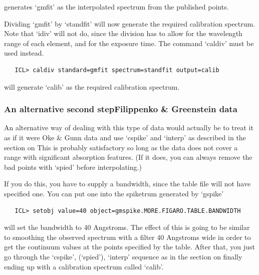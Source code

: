    generates `gmfit' as the interpolated spectrum from the published
   points.

   Dividing `gmfit' by `standfit' will now generate the required
   calibration spectrum.  Note that `idiv' will not do, since the
   division has to allow for the wavelength range of each element, and
   for the exposure time.  The command `caldiv' must be used instead.

\begin{verbatim}
   ICL> caldiv standard=gmfit spectrum=standfit output=calib
\end{verbatim}

   will generate `calib' as the required calibration spectrum.


\subsubsection{\label{techno5fgsecalt}An alternative second
   step\latorhtm{---}{-}Filippenko \& Greenstein data}

   An alternative way of dealing with this type of data would actually
   be to treat it as if it were Oke \& Gunn data and use `cspike' and
   `interp' as described in
   {the section on }
   This is probably satisfactory so long as the data does not cover a
   range with significant absorption features.  (If it does, you can
   always remove the bad points with `spied' before interpolating.)

   If you do this, you have to supply a bandwidth, since the table file
   will not have specified one.  You can put one into the spiketrum
   generated by `gspike'
   {}

\begin{verbatim}
   ICL> setobj value=40 object=gmspike.MORE.FIGARO.TABLE.BANDWIDTH
\end{verbatim}

   will set the bandwidth to 40 Angstroms.  The effect of this is going
   to be similar to smoothing the observed spectrum with a filter 40
   Angstroms wide in order to get the continuum values at the points
   specified by the table.  After that, you just go through the `cspike',
   (`spied'), `interp' sequence as in
   {the section on }
   finally ending up with a calibration spectrum called `calib'.

